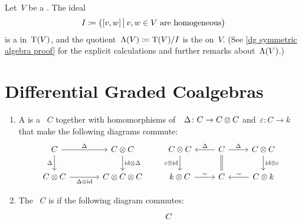 \documentclass[a4paper,10pt,headings=standardclasses]{scrartcl}
\begin{document}
\begin{example}
  \label{dg symmetric algebra}
  Let~$V$ be a {\dgv}.
  The ideal
  \[
    I
    \defined
    \bigl(
      [v,w]
    \suchthat[\big]
      \text{$v,w \in V$ are homogeneous}
    \bigr)
  \]
  is a {\dgi} in~$\operatorname{T}(V)$, and the quotient~$\operatorname{\Lambda}(V) \coloneqq \operatorname{T}(V)/I$ is the  on~$V$.
  (See \cref{dg symmetric algebra proof} for the explicit calculations and further remarks about~$\operatorname{\Lambda}(V)$.)
\end{example}



\section{Differential Graded Coalgebras}

\begin{definition}
  \leavevmode
  \begin{enumerate}
    \item
      A  is a {\dgv}~$C$ together with homomorphisms of~{\dgvs}~$\Delta \colon C \to C \otimes C$ and~$\varepsilon \colon C \to k$ that make the following diagrams commute:
      \[
        \begin{tikzcd}[column sep = large]
          C
          \arrow{r}[above]{\Delta}
          \arrow{d}[left]{\Delta}
          &
          C \tensor C
          \arrow{d}[right]{{\id} \tensor \Delta}
          \\
          C \tensor C
          \arrow{r}[below]{\Delta \tensor {\id}}
          &
          C \tensor C \tensor C
        \end{tikzcd}
        \qquad
        \begin{tikzcd}
          C \tensor C
          \arrow{d}[left]{\varepsilon \tensor {\id}}
          &
          C
          \arrow{l}[above]{\Delta}
          \arrow[equal]{d}
          \arrow{r}[above]{\Delta}
          &
          C \tensor C
          \arrow{d}[right]{{\id} \tensor \varepsilon}
          \\
          k \tensor C
          \arrow{r}[above]{\sim}
          &
          C
          &
          C \tensor k
          \arrow{l}[above]{\sim}
        \end{tikzcd}
      \]
    \item
      The {\dgc}~$C$ is  if the following diagram commutes:
      \[
        \begin{tikzcd}[column sep = small]
          {}
          &
          C

\end{tikzcd}\]
\end{enumerate}
\end{definition}
\end{document}
